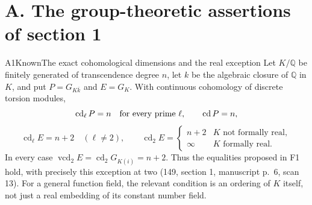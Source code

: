 \section{A. The group-theoretic assertions of section 1}


\begin{result}{A1}{Known}{The exact cohomological dimensions and the real exception}
\label{res:A1}
Let $K/\mathbb Q$ be finitely generated of transcendence degree $n$, let
$k$ be the algebraic closure of $\mathbb Q$ in $K$, and put
$P=G_{K\overline k}$ and $E=G_K$. With continuous cohomology of discrete
torsion modules,
\[
 \operatorname{cd}_\ell P=n\quad\hbox{for every prime }\ell,
 \qquad \operatorname{cd}P=n,
\]
\[
 \operatorname{cd}_\ell E=n+2\quad(\ell\ne2),\qquad
 \operatorname{cd}_2E=
 \begin{cases}n+2&K\text{ not formally real},\\
 \infty&K\text{ formally real}.
 \end{cases}
\]
In every case $\operatorname{vcd}_2E=\operatorname{cd}_2G_{K(i)}=n+2$.
Thus the equalities proposed in F1 hold, with precisely this exception
at two (149, section 1, manuscript p.~6, scan 13). For a general
function field, the relevant condition is an ordering of $K$ itself,
not just a real embedding of its constant number field.
\end{result}
